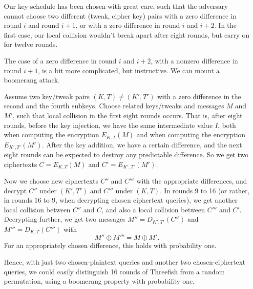 \documentclass[11pt,twoside]{article}
\begin{document}
Our key schedule has been chosen with great care, such that the adversary cannot choose two different (tweak, cipher key) pairs with a zero difference in round $i$ and round $i+1$, or with a zero difference in round $i$ and $i+2$. In the first case, our local collision wouldn't break apart after eight rounds, but carry on for twelve rounds.

The case of a zero difference in round $i$ and $i+2$, with a nonzero difference in round $i+1$, is a bit more complicated, but instructive. We can mount a boomerang attack.%

%

Assume two key/tweak pairs $(K,T) \neq (K',T')$ with a zero difference in the second and the fourth subkeys. Choose related keys/tweaks and messages $M$ and $M'$, such that local collision in the first eight rounds occurs. That is, after eight rounds, before the key injection, we have the same intermediate value $I$, both when computing the encryption $E_{K,T}(M)$ and when computing the encryption $E_{K',T'}(M')$. After the key addition, we have a certain difference, and the next eight rounds can be expected to destroy any predictable difference. So we get two ciphertexts $C=E_{K,T}(M)$ and $C'=E_{K',T'}(M')$.

Now we choose new ciphertexts $C''$ and $C'''$ with the appropriate
differences, and decrypt $C''$ under $(K',T')$ and $C'''$ under $(K,T)$. In
rounds 9 to 16 (or rather, in rounds 16 to 9, when decrypting chosen ciphertext
queries), we get another local collision between $C''$ and $C$, and also a
local collision between $C'''$ and $C'$. Decrypting further, we get two
messages $M''=D_{K',T'}(C'')$ and $M'''=D_{K,T}(C''')$ with 
  \[ M'' \oplus M''' = M \oplus M'. \]
For an appropriately chosen difference, this holds with probability one.

Hence, with just two chosen-plaintext queries and another two chosen-ciphertext queries, we could easily distinguish 16 rounds of Threefish from a random permutation, using a boomerang property with probability one.
\end{document}
